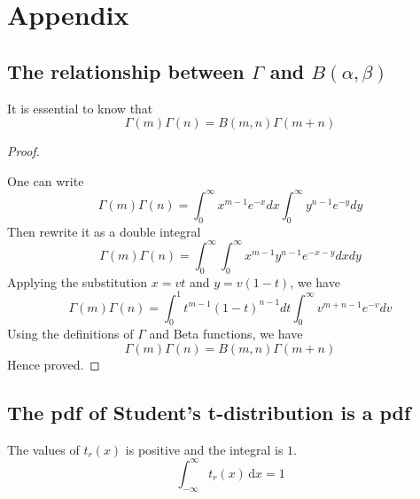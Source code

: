 \documentclass[a4paper]{article}
\begin{document}
\appendix

\section{Appendix}

\subsection{The relationship between $\Gamma$ and $B(\alpha, \beta)$}
It is essential to know that
\begin{equation*}
    \Gamma(m)\Gamma(n) = B(m, n) \Gamma(m+n)
\end{equation*}

\begin{proof} \label{The relationship between Gamma and Beta}

    One can write
    \begin{equation*}
        \Gamma(m)\Gamma(n) = \int_{0}^{\infty} x^{m-1} e^{-x} dx \int_{0}^{\infty} y^{n-1} e^{-y} dy
    \end{equation*}
    Then rewrite it as a double integral
    \begin{equation*}
        \Gamma(m)\Gamma(n) = \int_{0}^{\infty} \int_{0}^{\infty} x^{m-1} y^{n-1} e^{-x-y} dx dy
    \end{equation*}
    Applying the substitution $x=vt$ and $y=v(1-t)$, we have
    \begin{equation*}
        \Gamma(m)\Gamma(n) = \int_{0}^{1} t^{m-1} (1-t)^{n-1} dt \int_{0}^{\infty} v^{m+n-1} e^{-v} dv
    \end{equation*}
    Using the definitions of $\Gamma$ and Beta functions, we have
    \begin{equation*}
        \Gamma(m)\Gamma(n) = B(m, n) \Gamma(m+n)
    \end{equation*}
    Hence proved.
\end{proof}

\subsection{The pdf of Student's t-distribution is a pdf}
The values of $t_r(x)$ is positive and the integral is $1$.
\begin{equation*}
    \int_{-\infty}^{\infty} t_r(x) \,\mathrm{d}x = 1
\end{equation*}
\end{document}
